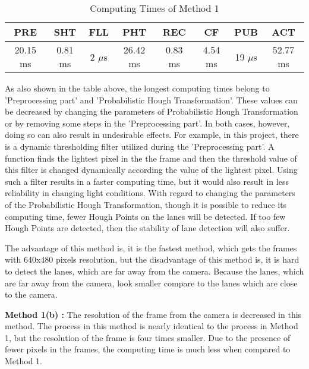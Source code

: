 \begin{table}[ht]
\caption{Computing Times of Method 1} 
\centering 
  \begin{tabular}{ | c | c | c | c | c | c | c | c |}
    \hline
  
  PRE & SHT & FLL & PHT & REC & CF & PUB & ACT \\ \hline  
  20.15 ms & 0.81 ms & 2 $\mu$s & 26.42 ms & 0.83 ms & 4.54 ms & 19 $\mu$s& 52.77 ms \\ \hline  
    
    
      \end{tabular}
      \label{tab:Case1_Times}
      \end{table}


As also shown in the table above, the longest computing times belong to 'Preprocessing part' and 'Probabilistic Hough Transformation'. These values can be decreased by changing the parameters of Probabilistic Hough Transformation or by removing some steps in the 'Preprocessing part'. In both cases, however, doing so can also result in undesirable effects. For example, in this project, there is a dynamic thresholding filter utilized during the 'Preprocessing part'. A function finds the lightest pixel in the the frame and then the threshold value of this filter is changed dynamically according the value of the lightest pixel. Using such a filter results in a faster computing time, but it would also result in less reliability in changing light conditions. With regard to changing the parameters of the Probabilistic Hough Transformation, though it is possible to reduce its computing time, fewer Hough Points on the lanes will be detected. If too few Hough Points are detected, then the stability of lane detection will also suffer.

The advantage of this method is, it is the fastest method, which gets the frames with 640x480 pixels resolution, but the disadvantage of this method is, it is hard to detect the lanes, which are far away from the camera. Because the lanes, which are far away from the camera, look smaller compare to the lanes which are close to the camera.




\textbf{Method 1(b) : }The resolution of the frame from the camera is decreased in this method. The
process in this method is nearly identical to the process in Method 1, but the resolution of the frame is four times smaller. Due to the presence of fewer pixels in the frames, the computing time is much less when compared to Method 1.




